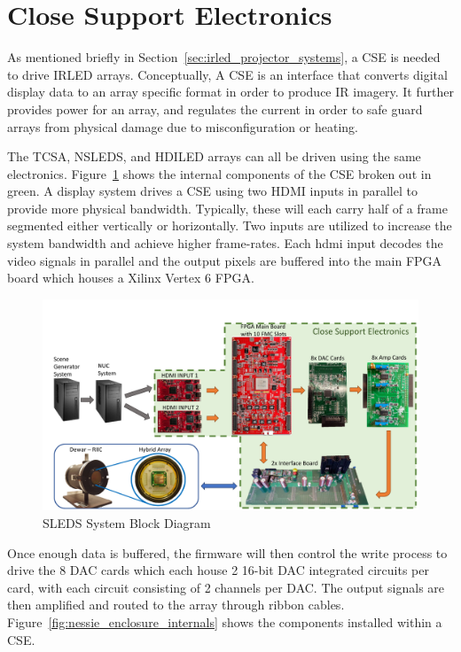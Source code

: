 \section{Close Support Electronics}
    \label{sec:close_support_electronics}
    As mentioned briefly in Section~\ref{sec:irled_projector_systems}, a CSE is needed to drive IRLED arrays. Conceptually, A CSE is an interface that converts digital display data to an array specific format in order to produce IR imagery. It further provides power for an array, and regulates the current in order to safe guard arrays from physical damage due to misconfiguration or heating.

    The TCSA, NSLEDS, and HDILED arrays can all be driven using the same electronics. Figure~\ref{fig:sleds_block} shows the internal components of the CSE broken out in green. A display system drives a CSE using two HDMI inputs in parallel to provide more physical bandwidth. Typically, these will each carry half of a frame segmented either vertically or horizontally. Two inputs are utilized to increase the system bandwidth and achieve higher frame-rates. Each hdmi input decodes the video signals in parallel and the output pixels are buffered into the main FPGA board which houses a Xilinx Vertex 6 FPGA\cite{XILINX1}.

    \begin{figure}
        \centering
        \includegraphics[width=1.0\textwidth]{fig/sleds_block.pdf}
        \caption{SLEDS System Block Diagram}
        \label{fig:sleds_block}
    \end{figure}

    Once enough data is buffered, the firmware will then control the write process to drive the 8 DAC cards which each house 2 16-bit DAC integrated circuits per card, with each circuit consisting of 2 channels per DAC. The output signals are then amplified and routed to the array through ribbon cables. Figure~\ref{fig:nessie_enclosure_internals} shows the components installed within a CSE.

